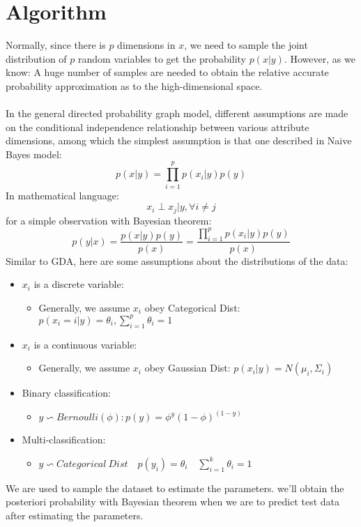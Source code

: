 \documentclass{report}
\begin{document}
\section{Algorithm}
Normally, since there is $p$ dimensions in $x$, we need to sample the joint distribution of $p$ random variables to get the probability $p(x|y)$. However, as we know: A huge number of samples are needed to obtain the relative accurate probability approximation as to the high-dimensional space.\\\\
In the general directed probability graph model, different assumptions are made on the conditional independence relationship between various attribute dimensions, among which the simplest assumption is that one described in Naive Bayes model:
$$
p(x|y)=\prod_{i=1}^p p(x_i|y)p(y)
$$
In mathematical language:
$$
x_{i} \perp x_{j} | y, \forall i \neq j
$$
for a simple observation with Bayesian theorem:
$$
p(y|x)=\frac{p(x|y)p(y)}{p(x)}=\frac{\prod_{i=1}^p p(x_i|y)p(y)}{p(x)}
$$
Similar to GDA, here are some assumptions about the distributions of the data:
\begin{itemize}
	\item $x_i$ is a discrete variable:
	\begin{itemize}
	\item Generally, we assume $x_i$ obey Categorical Dist: $p(x_i=i|y)=\theta_i,\sum_{i=1}^p \theta_i =1$
	\end{itemize}
	\item $x_i$ is a continuous variable:
	\begin{itemize}
	\item Generally, we assume $x_i$ obey Gaussian Dist: $p(x_i|y)=N(\mu_i, \Sigma_i)$
	\end{itemize}
\end{itemize}
\begin{itemize}
	\item Binary classification:
	\begin{itemize}
	\item $y \backsim Bernoulli(\phi):p(y)=\phi^y (1-\phi)^{(1-y)}$ 
	\end{itemize}
	\item Multi-classification:
	\begin{itemize}
	\item $y \backsim Categorical\ Dist\quad p(y_i)=\theta_i\quad \sum_{i=1}^k \theta_i=1$
	\end{itemize}
\end{itemize}
We are used to sample the dataset to estimate the parameters. we'll obtain the posteriori probability with Bayesian theorem when we are to predict test data after estimating the parameters.
\end{document}

